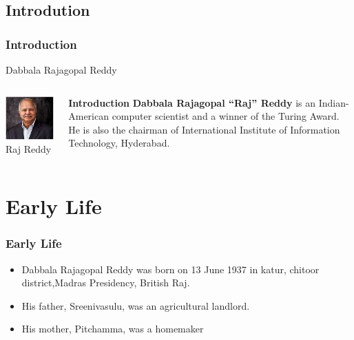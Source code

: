 \documentclass{beamer}
\begin{document}
 
\begin{frame}
 \section{Introdution}
 \transdissolve
 \frametitle{Introduction}
 \begin{block}{}
   Dabbala Rajagopal Reddy
 \end{block}	

 \begin{columns}
  \begin{column}{0.35\textwidth}
   \begin{center}
     \includegraphics[scale=0.5]{raj.jpeg} \\
     Raj Reddy
   \end{center} 
   \end{column}
   
   
  \begin{column}{0.55\textwidth}
   \begin{block}{\bf Introduction}
   {\bf Dabbala Rajagopal ``Raj'' Reddy} is an Indian-American computer scientist
   and a winner of the Turing Award. He is also the chairman of International 
   Institute of Information Technology, Hyderabad.
    \end{block}
  \end{column}
 \end{columns}
\end{frame}


 \section{Early Life}
\begin{frame}
 \transblindshorizontal
  \frametitle{\bf Early Life}
  \begin{itemize}
   \item<1-> Dabbala Rajagopal Reddy was born on 13 June 1937 in katur, chitoor
   district,Madras Presidency, British Raj.
   \item<2-> His father, Sreenivasulu, was an agricultural landlord.
   \item<3-> His mother, Pitchamma, was a homemaker
  \end{itemize}  
\end{frame}
\end{document}
